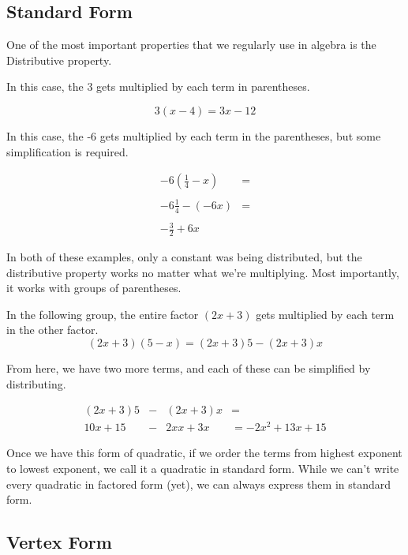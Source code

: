 \subsection*{Standard Form}


One of the most important properties that we regularly use in algebra is the Distributive property.

\begin{example}

In this case, the 3 gets multiplied by each term in parentheses.

$$3(x-4) = 3x - 12$$

In this case, the -6 gets multiplied by each term in the parentheses, but some simplification is required.

$$\begin{array}{rl}
-6(\frac{1}{4}- x) & = \\ & \\
-6\frac{1}{4} -(-6x) & = \\ & \\
-\frac{3}{2} + 6x\end{array}$$

\end{example}

In both of these examples, only a constant was being distributed, but the distributive property works no matter what we're multiplying.  Most importantly, it works with groups of parentheses.

\begin{example}

In the following group, the entire factor $(2x + 3)$ gets multiplied by each term in the other factor.
$$(2x + 3)(5-x) = (2x+3)5 - (2x+3)x$$

From here, we have two more terms, and each of these can be simplified by distributing.

$$\begin{array}{rcll}
(2x + 3)5 & - & (2x + 3)x & = \\
10x+15 & - & 2xx+3x & = -2x^2 + 13x + 15\end{array}$$
\end{example}

Once we have this form of quadratic, if we order the terms from highest exponent to lowest exponent, we call it a quadratic in standard form.  While we can't write every quadratic in factored form (yet), we can always express them in standard form.

\subsection*{Vertex Form}

